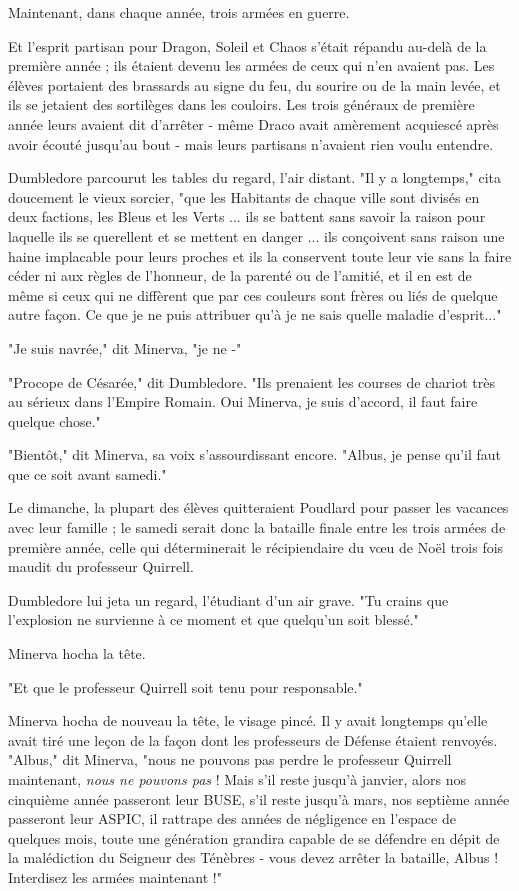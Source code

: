 Maintenant, dans chaque année, trois armées en guerre.

Et l'esprit partisan pour Dragon, Soleil et Chaos s'était répandu au-delà de la première année ; ils étaient devenu les armées de ceux qui n'en avaient pas. Les élèves portaient des brassards au signe du feu, du sourire ou de la main levée, et ils se jetaient des sortilèges dans les couloirs. Les trois généraux de première année leurs avaient dit d'arrêter - même Draco avait amèrement acquiescé après avoir écouté jusqu'au bout - mais leurs partisans n'avaient rien voulu entendre.

Dumbledore parcourut les tables du regard, l'air distant. "Il y a longtemps," cita doucement le vieux sorcier, "que les Habitants de chaque ville sont divisés en deux factions, les Bleus et les Verts ... ils se battent sans savoir la raison pour laquelle ils se querellent et se mettent en danger ... ils conçoivent sans raison une haine implacable pour leurs proches et ils la conservent toute leur vie sans la faire céder ni aux règles de l'honneur, de la parenté ou de l'amitié, et il en est de même si ceux qui ne diffèrent que par ces couleurs sont frères ou liés de quelque autre façon. Ce que je ne puis attribuer qu'à je ne sais quelle maladie d'esprit..."

"Je suis navrée," dit Minerva, "je ne -"

"Procope de Césarée," dit Dumbledore. "Ils prenaient les courses de chariot très au sérieux dans l'Empire Romain. Oui Minerva, je suis d'accord, il faut faire quelque chose."

"Bientôt," dit Minerva, sa voix s'assourdissant encore. "Albus, je pense qu'il faut que ce soit avant samedi."

Le dimanche, la plupart des élèves quitteraient Poudlard pour passer les vacances avec leur famille ; le samedi serait donc la bataille finale entre les trois armées de première année, celle qui déterminerait le récipiendaire du vœu de Noël trois fois maudit du professeur Quirrell.

Dumbledore lui jeta un regard, l'étudiant d'un air grave. "Tu crains que l'explosion ne survienne à ce moment et que quelqu'un soit blessé."

Minerva hocha la tête.

"Et que le professeur Quirrell soit tenu pour responsable."

Minerva hocha de nouveau la tête, le visage pincé. Il y avait longtemps qu'elle avait tiré une leçon de la façon dont les professeurs de Défense étaient renvoyés. "Albus," dit Minerva, "nous ne pouvons pas perdre le professeur Quirrell maintenant, \emph{nous ne pouvons pas}  ! Mais s'il reste jusqu'à janvier, alors nos cinquième année passeront leur BUSE, s'il reste jusqu'à mars, nos septième année passeront leur ASPIC, il rattrape des années de négligence en l'espace de quelques mois, toute une génération grandira capable de se défendre en dépit de la malédiction du Seigneur des Ténèbres - vous devez arrêter la bataille, Albus ! Interdisez les armées maintenant !"

